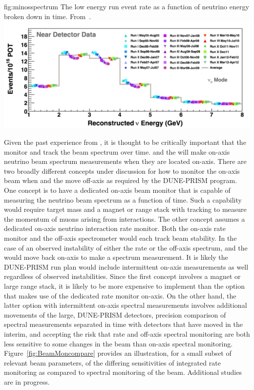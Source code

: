 \begin{dunefigure}{fig:minosspectrum}
{The low energy run  event rate as a function of neutrino energy broken down in time. From~\cite{Holin2017}.}
  \includegraphics[width=5.in]{graphics/MINOS_LE_run.jpg}
\end{dunefigure}

Given the past experience from , it is thought to be critically important that the   monitor and track the beam spectrum over time.     and the  will make on-axis neutrino beam spectrum measurements when they are located on-axis.  There are two broadly different concepts under discussion for how to monitor the on-axis beam when  and the  move off-axis as required by the DUNE-PRISM program.  One concept is to have a dedicated on-axis beam monitor that is capable of measuring the neutrino beam spectrum as a function of time.  Such a capability would require target mass and a magnet or range stack with tracking to measure the momentum of muons arising from  \numu interactions.  The other concept assumes a dedicated on-axis neutrino interaction rate monitor.  Both the on-axis rate monitor and the off-axis spectrometer would each track beam stability. In the case of an observed instability of either the rate or the off-axis spectrum,  and the  would move back on-axis to make a spectrum measurement. It is likely the DUNE-PRISM run plan would include intermittent on-axis measurements as well regardless of observed instabilities.  Since the first concept involves a magnet or large range stack, it is likely to be more expensive to implement than the option that makes use of the dedicated rate monitor on-axis.  On the other hand, the latter option with intermittent on-axis spectral measurements involves additional movements of the large, DUNE-PRISM detectors, precision comparison of spectral measurements separated in time with detectors that have moved in the interim, and accepting the risk that rate and off-axis spectral monitoring are both less sensitive to some changes in the beam than on-axis spectral monitoring.  Figure~\ref{fig:BeamMoncompare} provides an illustration, for a small subset of relevant beam parameters, of the differing sensitivities of integrated rate monitoring as compared to spectral monitoring of the beam.  Additional studies are in progress.



